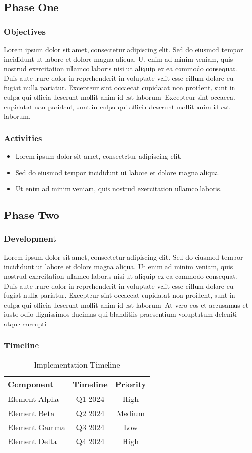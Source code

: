 \documentclass[11pt,a4paper]{article}
\newcommand{\loremtext}[1]{%
  Lorem ipsum dolor sit amet, consectetur adipiscing elit. Sed do eiusmod tempor incididunt ut labore et dolore magna aliqua. Ut enim ad minim veniam, quis nostrud exercitation ullamco laboris nisi ut aliquip ex ea commodo consequat. Duis aute irure dolor in reprehenderit in voluptate velit esse cillum dolore eu fugiat nulla pariatur. Excepteur sint occaecat cupidatat non proident, sunt in culpa qui officia deserunt mollit anim id est laborum.%
}
\begin{document}
\subsection{Phase One}

\subsubsection{Objectives}
\loremtext{8} Excepteur sint occaecat cupidatat non proident, sunt in culpa qui officia deserunt mollit anim id est laborum.

\subsubsection{Activities}
\begin{itemize}
  \item Lorem ipsum dolor sit amet, consectetur adipiscing elit.
  \item Sed do eiusmod tempor incididunt ut labore et dolore magna aliqua.
  \item Ut enim ad minim veniam, quis nostrud exercitation ullamco laboris.
\end{itemize}

\subsection{Phase Two}

\subsubsection{Development}
\loremtext{9} At vero eos et accusamus et iusto odio dignissimos ducimus qui blanditiis praesentium voluptatum deleniti atque corrupti.

\subsubsection{Timeline}
\begin{table}[h]
\centering
\begin{tabular}{|l|c|c|}
\hline
\textbf{Component} & \textbf{Timeline} & \textbf{Priority} \\
\hline
Element Alpha & Q1 2024 & High \\
\hline
Element Beta & Q2 2024 & Medium \\
\hline
Element Gamma & Q3 2024 & Low \\
\hline
Element Delta & Q4 2024 & High \\
\hline
\end{tabular}
\caption{Implementation Timeline}
\end{table}
\end{document}
